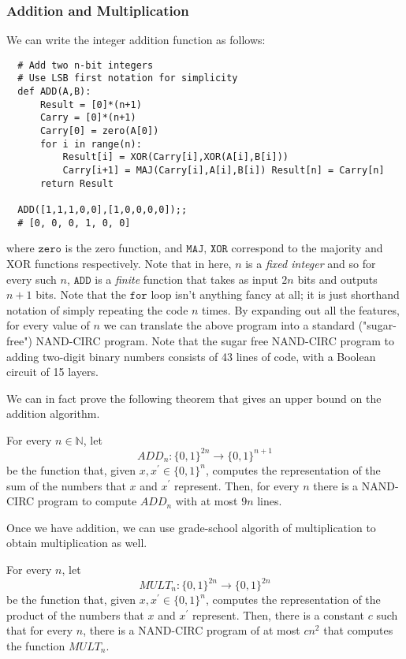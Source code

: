 \documentclass{article}
\begin{document}
  \subsubsection{Addition and Multiplication}
  We can write the integer addition function as follows: 
  \begin{lstlisting}
  # Add two n-bit integers
  # Use LSB first notation for simplicity 
  def ADD(A,B):
      Result = [0]*(n+1) 
      Carry = [0]*(n+1) 
      Carry[0] = zero(A[0]) 
      for i in range(n):
          Result[i] = XOR(Carry[i],XOR(A[i],B[i]))
          Carry[i+1] = MAJ(Carry[i],A[i],B[i]) Result[n] = Carry[n]
      return Result
      
  ADD([1,1,1,0,0],[1,0,0,0,0]);; 
  # [0, 0, 0, 1, 0, 0]
  \end{lstlisting}
  where $\texttt{zero}$ is the zero function, and $\texttt{MAJ, XOR}$ correspond to the majority and XOR functions respectively. Note that in here, $n$ is a \textit{fixed integer} and so for every such $n$, $\texttt{ADD}$ is a \textit{finite} function that takes as input $2n$ bits and outputs $n+1$ bits. Note that the $\texttt{for}$ loop isn't anything fancy at all; it is just shorthand notation of simply repeating the code $n$ times. By expanding out all the features, for every value of $n$ we can translate the above program into a standard ("sugar-free") NAND-CIRC program. Note that the sugar free NAND-CIRC program to adding two-digit binary numbers consists of 43 lines of code, with a Boolean circuit of 15 layers. 

  We can in fact prove the following theorem that gives an upper bound on the addition algorithm. 

  \begin{theorem}
  For every $n \in \mathbb{N}$, let 
  \[ADD_n : \{0,1\}^{2n} \longrightarrow \{0,1\}^{n+1}\]
  be the function that, given $x, x^\prime \in \{0,1\}^n$, computes the representation of the sum of the numbers that $x$ and $x^\prime$ represent. Then, for every $n$ there is a NAND-CIRC program to compute $ADD_n$ with at most $9n$ lines. 
  \end{theorem}

  Once we have addition, we can use grade-school algorith of multiplication to obtain multiplication as well. 

  \begin{theorem}
  For every $n$, let 
  \[MULT_n : \{0,1\}^{2n} \longrightarrow \{0,1\}^{2n}\]
  be the function that, given $x, x^\prime \in \{0,1\}^n$, computes the representation of the product of the numbers that $x$ and $x^\prime$ represent. Then, there is a constant $c$ such that for every $n$, there is a NAND-CIRC program of at most $cn^2$ that computes the function $MULT_n$. 
  \end{theorem}
\end{document}
